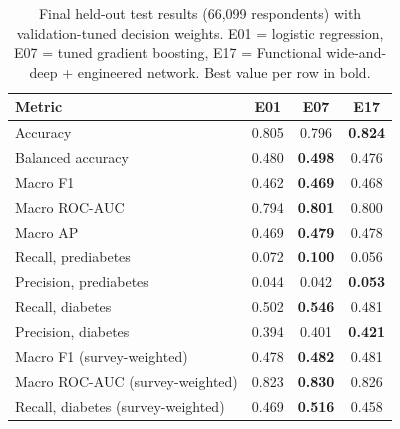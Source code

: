 \begin{table}[t]
\centering\footnotesize
\caption{Final held-out test results (66,099 respondents) with validation-tuned decision weights. E01 = logistic regression, E07 = tuned gradient boosting, E17 = Functional wide-and-deep + engineered network. Best value per row in bold.}
\label{tab:test}
\begin{tabular}{@{}lccc@{}}
\toprule
Metric & \textbf{E01} & \textbf{E07} & \textbf{E17}\\
\midrule
Accuracy & 0.805 & 0.796 & \textbf{0.824} \\
Balanced accuracy & 0.480 & \textbf{0.498} & 0.476 \\
Macro F1 & 0.462 & \textbf{0.469} & 0.468 \\
Macro ROC-AUC & 0.794 & \textbf{0.801} & 0.800 \\
Macro AP & 0.469 & \textbf{0.479} & 0.478 \\
Recall, prediabetes & 0.072 & \textbf{0.100} & 0.056 \\
Precision, prediabetes & 0.044 & 0.042 & \textbf{0.053} \\
Recall, diabetes & 0.502 & \textbf{0.546} & 0.481 \\
Precision, diabetes & 0.394 & 0.401 & \textbf{0.421} \\
Macro F1 (survey-weighted) & 0.478 & \textbf{0.482} & 0.481 \\
Macro ROC-AUC (survey-weighted) & 0.823 & \textbf{0.830} & 0.826 \\
Recall, diabetes (survey-weighted) & 0.469 & \textbf{0.516} & 0.458 \\
\bottomrule
\end{tabular}
\end{table}
